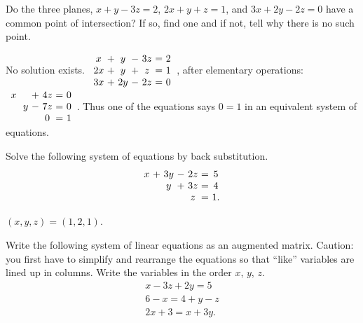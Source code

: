 \begin{enumialphparenastyle}
\begin{ex}
  Do the three planes, $x+y-3z=2$, $2x+y+z=1$, and $3x+2y-2z=0$ have a
  common point of intersection? If so, find one and if not, tell why
  there is no such point.
  \begin{sol}
    No solution exists. $
    \begin{array}{c@{~}c@{~}c@{~}c@{~}c@{~}c@{~}c}
      x &+& y &-& 3z &=& 2 \\
      2x &+& y &+& z &=& 1 \\
      3x &+& 2y &-& 2z &=& 0
    \end{array}
    $, after elementary operations: 
    $\begin{array}{c@{~}c@{~}c@{~}c@{~}c@{~}c@{~}c}
      x & &   &+& 4z &=& 0 \\
        & & y &-& 7z &=& 0 \\
        & &   & & 0 &=& 1
     \end{array}$.
    Thus one of the equations says $0=1$ in an equivalent system of
    equations.
  \end{sol}
\end{ex}

\begin{ex}
  Solve the following system of equations by back substitution.
  \begin{equation*}
    \begin{array}{c@{~}c@{~}c@{~}c@{~}c@{~}c@{~}c}
      x &+& 3y &-& 2z &=& 5 \\
        & & y  &+& 3z &=& 4 \\
        & &    & & z  &=& 1.
    \end{array}
  \end{equation*}

  \begin{sol}
    $(x,y,z) = (1,2,1)$.
  \end{sol}
\end{ex}

\begin{ex}
  Write the following system of linear equations as an augmented
  matrix. Caution: you first have to simplify and rearrange the
  equations so that ``like'' variables are lined up in columns. Write
  the variables in the order $x$, $y$, $z$.
  \begin{equation*}
    \begin{array}{c}
      x - 3z + 2y = 5 \\
      6 - x = 4 + y - z\\
      2x + 3 = x + 3y.
    \end{array}
  \end{equation*}


\end{ex}
\end{enumialphparenastyle}
